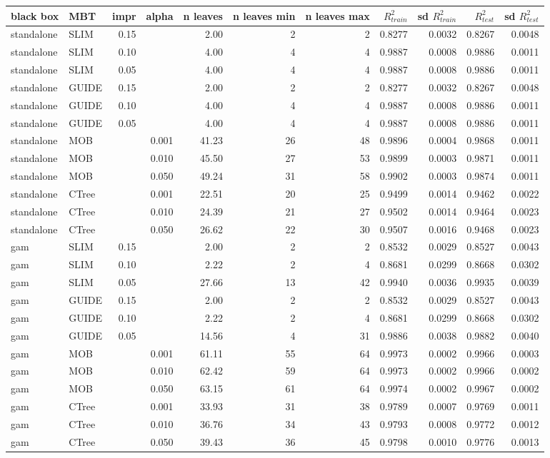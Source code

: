 \begin{table}[!htb]

\centering \tiny
\begin{tabular}[t]{l|l|r|r|r|r|r|r|r|r|r}
\hline
black box & MBT & impr & alpha & n leaves & n leaves min & n leaves max &  $R^2_{train}$ & sd $R^2_{train}$ & $R^2_{test}$ & sd $R^2_{test}$\\
\hline
standalone & SLIM & 0.15 & & 2.00 & 2 & 2 & 0.8277 & 0.0032 & 0.8267 & 0.0048\\
standalone & SLIM & 0.10 & & 4.00 & 4 & 4 & 0.9887 & 0.0008 & 0.9886 & 0.0011\\
standalone & SLIM & 0.05 & & 4.00 & 4 & 4 & 0.9887 & 0.0008 & 0.9886 & 0.0011\\
standalone & GUIDE & 0.15 & & 2.00 & 2 & 2 & 0.8277 & 0.0032 & 0.8267 & 0.0048\\
standalone & GUIDE & 0.10 & & 4.00 & 4 & 4 & 0.9887 & 0.0008 & 0.9886 & 0.0011\\
standalone & GUIDE & 0.05 & & 4.00 & 4 & 4 & 0.9887 & 0.0008 & 0.9886 & 0.0011\\
standalone & MOB & & 0.001 & 41.23 & 26 & 48 & 0.9896 & 0.0004 & 0.9868 & 0.0011\\
standalone & MOB & & 0.010 & 45.50 & 27 & 53 & 0.9899 & 0.0003 & 0.9871 & 0.0011\\
standalone & MOB & & 0.050 & 49.24 & 31 & 58 & 0.9902 & 0.0003 & 0.9874 & 0.0011\\
standalone & CTree & & 0.001 & 22.51 & 20 & 25 & 0.9499 & 0.0014 & 0.9462 & 0.0022\\
standalone & CTree & & 0.010 & 24.39 & 21 & 27 & 0.9502 & 0.0014 & 0.9464 & 0.0023\\
standalone & CTree & & 0.050 & 26.62 & 22 & 30 & 0.9507 & 0.0016 & 0.9468 & 0.0023\\

\hline
gam & SLIM & 0.15 & & 2.00 & 2 & 2 & 0.8532 & 0.0029 & 0.8527 & 0.0043\\
gam & SLIM & 0.10 & & 2.22 & 2 & 4 & 0.8681 & 0.0299 & 0.8668 & 0.0302\\
gam & SLIM & 0.05 & & 27.66 & 13 & 42 & 0.9940 & 0.0036 & 0.9935 & 0.0039\\
gam & GUIDE & 0.15 & & 2.00 & 2 & 2 & 0.8532 & 0.0029 & 0.8527 & 0.0043\\
gam & GUIDE & 0.10 & & 2.22 & 2 & 4 & 0.8681 & 0.0299 & 0.8668 & 0.0302\\
gam & GUIDE & 0.05 & & 14.56 & 4 & 31 & 0.9886 & 0.0038 & 0.9882 & 0.0040\\
gam & MOB & & 0.001 & 61.11 & 55 & 64 & 0.9973 & 0.0002 & 0.9966 & 0.0003\\
gam & MOB & & 0.010 & 62.42 & 59 & 64 & 0.9973 & 0.0002 & 0.9966 & 0.0002\\
gam & MOB & & 0.050 & 63.15 & 61 & 64 & 0.9974 & 0.0002 & 0.9967 & 0.0002\\
gam & CTree & & 0.001 & 33.93 & 31 & 38 & 0.9789 & 0.0007 & 0.9769 & 0.0011\\
gam & CTree & & 0.010 & 36.76 & 34 & 43 & 0.9793 & 0.0008 & 0.9772 & 0.0012\\
gam & CTree & & 0.050 & 39.43 & 36 & 45 & 0.9798 & 0.0010 & 0.9776 & 0.0013\\


\end{tabular}
\end{table}
